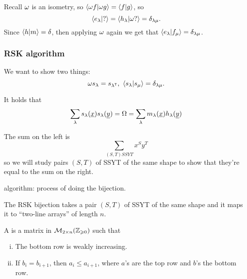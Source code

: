 \documentclass[12pt]{memoir}
\begin{document}
Recall $\omega$ is an isometry, so $\braket{\omega f}{\omega g}=\braket{f}{g}$, so
$$\braket{e_\lambda}{?}=\braket{h_\lambda}{\omega ?}=\delta_{\lambda\mu}.$$
Since $\braket{h}{m}=\delta$, then applying $\omega$ again we get that $\braket{e_\lambda}{f_\mu}=\delta_{\lambda\mu}$.

\subsubsection{RSK algorithm}

We want to show two things:
$$\omega s_\lambda=s_{\lambda^{\mathsf{T}}},\ \braket{s_\lambda}{s_\mu}=\delta_{\lambda\mu}.$$

\begin{Prop}
    It holds that 
    $$\sum_{\lambda}s_\lambda(\underline x)s_\lambda(\underline y)=\Omega=\sum_{\lambda}m_\lambda(\underline x)h_\lambda(\underline y)$$
\end{Prop}

\begin{ptcbp}
    The sum on the left is 
    $$\sum_{(S,T)SSYT}x^Sy^T$$
    so we will study pairs $(S,T)$ of SSYT of the same shape to show that they're equal to the sum on the right. 
\end{ptcbp}

algorithm: process of doing the bijection.\par 
The RSK bijection takes a pair $(S,T)$ of SSYT of the same shape and it maps it to ``two-line arrays'' of length $n$. 

\begin{Def}
    A  is a matrix in $\mathcal{M}_{2\times n}(\mathbb{Z}_{\geqslant 0})$ such that 
    \begin{enumerate}[i)]
        \itemsep=-0.4em
        \item The bottom row is weakly increasing.
        \item If $b_i=b_{i+1}$, then $a_{i}\leq a_{i+1}$, where $a$'s are the top row and $b$'s the bottom row.
    \end{enumerate}
\end{Def}
\end{document}
